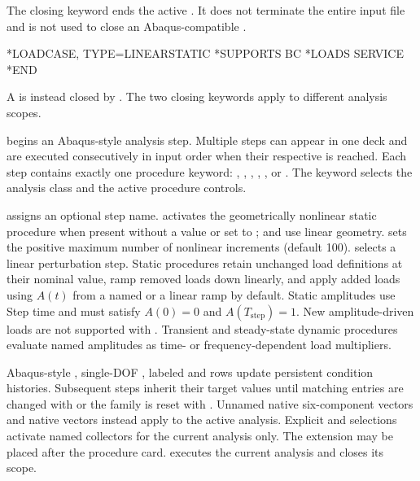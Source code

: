 The closing keyword ends the active . It does not terminate the entire input file and is not used to close an Abaqus-compatible .

\exampleheading

\begin{inputdeck}
*LOADCASE, TYPE=LINEARSTATIC
*SUPPORTS
BC
*LOADS
SERVICE
*END
\end{inputdeck}

A  is instead closed by .
The two closing keywords apply to different analysis scopes.


 begins an Abaqus-style analysis step. Multiple steps can appear in one deck and are executed consecutively in input order when their respective  is reached. Each step contains exactly one procedure keyword: , , , , , or . The keyword selects the analysis class and the active procedure controls.

 assigns an optional step name.  activates the geometrically nonlinear static procedure when present without a value or set to ;  and  use linear geometry.  sets the positive maximum number of nonlinear increments (default 100).  selects a linear perturbation step. Static procedures retain unchanged load definitions at their nominal value, ramp removed loads down linearly, and apply added loads using \(A(t)\) from a named  or a linear ramp by default. Static amplitudes use Step time and must satisfy \(A(0)=0\) and \(A(T_{\mathrm{step}})=1\). New amplitude-driven loads are not supported with . Transient and steady-state dynamic procedures evaluate named amplitudes as time- or frequency-dependent load multipliers.

Abaqus-style , single-DOF , labeled  and  rows update persistent condition histories. Subsequent steps inherit their target values until matching entries are changed with  or the family is reset with . Unnamed native six-component  vectors and native  vectors instead apply to the active analysis. Explicit  and  selections activate named collectors for the current analysis only. The  extension may be placed after the procedure card.  executes the current analysis and closes its scope.


